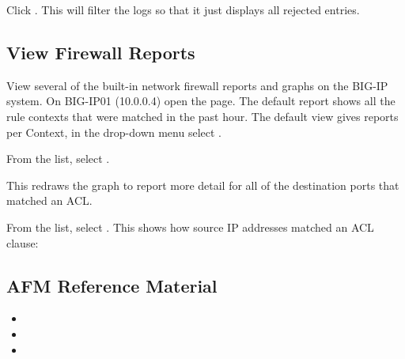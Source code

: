 \documentclass[letterpaper,10pt,english]{sphinxmanual}
\begin{document}
Click . This will filter the logs so that it just displays
all rejected entries.


\subsection{View Firewall Reports}
\label{\detokenize{class1/module1/lab6:view-firewall-reports}}\label{\detokenize{class1/module1/lab6::doc}}
View several of the built-in network firewall reports and graphs on the
BIG-IP system. On BIG-IP01 (10.0.0.4) open the  page. The default report shows all the rule
contexts that were matched in the past hour. The default view gives
reports per Context, in the drop-down menu select .


From the  list, select .


This redraws the graph to report more detail for all of the destination
ports that matched an ACL.


From the  list, select . This shows how source IP addresses matched an ACL clause:



\subsection{AFM Reference Material}
\label{\detokenize{class1/module1/lab6:afm-reference-material}}\begin{itemize}
\item {} 

\item {} 

\item {} 

\end{itemize}
\end{document}
